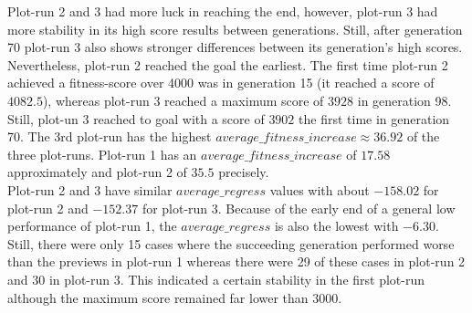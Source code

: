 			Plot-run 2 and 3 had more luck in reaching the end, however, plot-run 3 had more stability in its high score results between generations. Still, after generation 70 plot-run 3 also shows stronger differences between its generation's high scores. Nevertheless, plot-run 2 reached the goal the earliest. The first time plot-run 2 achieved a fitness-score over 4000 was in generation 15 (it reached a score of $4082.5$), whereas plot-run 3 reached a maximum score of $3928$ in generation 98. Still, plot-un 3 reached to goal with a score of $3902$ the first time in generation 70. The 3rd plot-run has the highest $average\_fitness\_increase\approx36.92$ of the three plot-runs. Plot-run 1 has an $average\_fitness\_increase$ of $17.58$ approximately and plot-run 2 of $35.5$ precisely.\\
			Plot-run 2 and 3 have similar $average\_regress$ values with about $-158.02$ for plot-run 2 and $-152.37$ for plot-run 3. Because of the early end of a general low performance of plot-run 1, the $average\_regress$ is also the lowest with $-6.30$. Still, there were only 15 cases where the succeeding generation performed worse than the previews in plot-run 1 whereas there were 29 of these cases in plot-run 2 and 30 in plot-run 3. This indicated a certain stability in the first plot-run although the maximum score remained far lower than $3000$.
		
		
